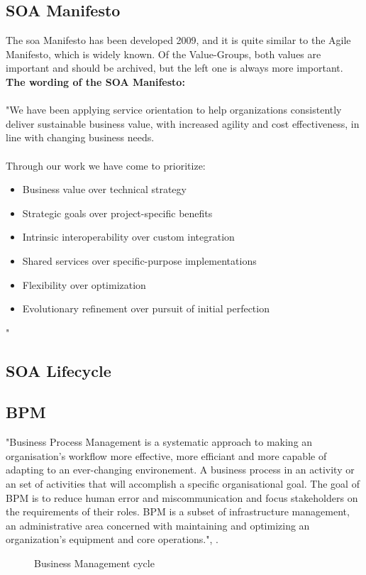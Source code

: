 \documentclass[12pt]{article}
\begin{document}
\subsection{SOA Manifesto}
The \gls{soa} Manifesto has been developed 2009, and it is quite similar to the Agile Manifesto, which is widely known. Of the Value-Groups, both values are important and should be archived, but the left one is always more important. \\
\textbf{The wording of the SOA Manifesto:}\\ \\
"We have been applying service orientation to help organizations 
consistently deliver sustainable business value, with increased agility
and cost effectiveness, in line with changing business needs. \\ \\
Through our work we have come to prioritize: \\
\begin{itemize}
\item Business value over technical strategy 
\item Strategic goals over project-specific benefits 
\item Intrinsic interoperability over custom integration 
\item Shared services over specific-purpose implementations 
\item Flexibility over optimization
\item Evolutionary refinement over pursuit of initial perfection
\end{itemize}" \cite{soamaifesto} 
\subsection{SOA Lifecycle}


\subsection{BPM}
"Business Process Management is a systematic approach to making an organisation's workflow more effective, more efficiant and more capable of adapting to an ever-changing environement. A business process in an activity or an set of activities that will accomplish a specific organisational goal. The goal of BPM is to reduce human error and miscommunication and focus stakeholders on the requirements of their roles. BPM is a subset of infrastructure management, an administrative area concerned with maintaining and optimizing an organization's equipment and core operations.", \cite{bpmdef}. 
\begin{figure}[here!]
	\centering
	\caption{Business Management cycle \cite{muede2}}
	\label{fig:anfang}
	\end{figure}
\end{document}
